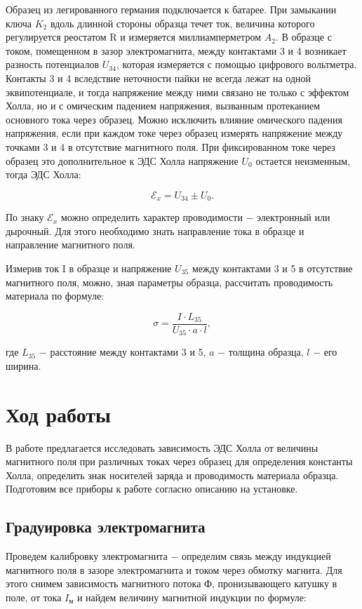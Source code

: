 \documentclass[a4paper,12pt]{article} %
\begin{document}
\hfill \break Образец из легированного германия подключается к батарее. При замыкании ключа $K_{2}$ вдоль длинной стороны образца течет ток, величина которого регулируется реостатом R и измеряется миллиамперметром $A_{2}$. В образце с током, помещенном в зазор электромагнита, между контактами 3 и 4 возникает разность потенциалов $U_{34}$, которая измеряется с помощью цифрового вольтметра. Контакты 3 и 4 вследствие неточности пайки не всегда лежат на одной эквипотенциале, и тогда напряжение между ними связано не только с эффектом Холла, но и с омическим падением напряжения, вызванным протеканием основного тока через образец. Можно исключить влияние омического падения напряжения, если при каждом токе через образец измерять напряжение между точками 3 и 4 в отсутствие магнитного поля. При фиксированном токе через образец это дополнительное к ЭДС Холла напряжение $U_{0}$ остается неизменным, тогда ЭДС Холла: 

\begin{equation}\label{ linkname }
\mathcal{E}_{x} = U_{34} \pm U_{0}. 
\end{equation}

\hfill \break По знаку $\mathcal{E}_{x}$ можно определить характер проводимости $-$ электронный или дырочный. Для этого необходимо знать направление тока в образце и направление магнитного поля.

\hfill \break Измерив ток I в образце и напряжение $U_{35}$ между контактами 3 и 5 в отсутствие магнитного поля, можно, зная параметры образца, рассчитать проводимость материала по формуле:

\begin{equation}\label{ linkname }
\sigma = \frac{I \cdot L_{35}}{U_{35} \cdot a \cdot l},
\end{equation}

\hfill \break где $L_{35}$ $-$ расстояние между контактами 3 и 5, $a$ $-$ толщина образца, $l$ $-$ его ширина.

\section{Ход работы}
\hfill \break В работе предлагается исследовать зависимость ЭДС Холла от величины магнитного поля при различных токах через образец для определения константы Холла, определить знак носителей заряда и проводимость материала образца. Подготовим все приборы к работе согласно описанию на установке.

\subsection{Градуировка электромагнита}
\hfill \break Проведем калибровку электромагнита $-$ определим связь между индукцией магнитного поля в зазоре электромагнита и током через обмотку магнита. Для этого снимем зависимость магнитного потока Ф, пронизывающего катушку в поле, от тока $I_\text{м}$ и найдем величину магнитной индукции по формуле:
\end{document}
